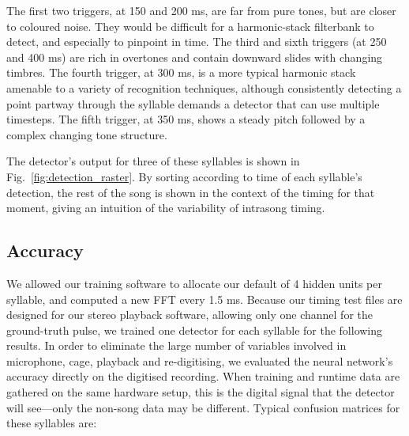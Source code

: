 \documentclass[10pt,letterpaper]{article}
\newcommand\fig[1]{Fig.~\ref{#1}}
\let\oldmarginpar\marginpar
\renewcommand{\marginpar}[1]{\oldmarginpar{\linespread{1}\scriptsize{#1}}}
\begin{document}
The first two triggers, at 150 and 200 ms, are far from pure tones, but are closer to coloured noise.  They would be difficult for a harmonic-stack filterbank to detect, and especially to pinpoint in time.  The third and sixth triggers (at 250 and 400 ms) are rich in overtones and contain downward slides with changing timbres.  The fourth trigger, at 300 ms, is a more typical harmonic stack amenable to a variety of recognition techniques, although consistently detecting a point partway through the syllable demands a detector that can use multiple timesteps.  The fifth trigger, at 350 ms, shows a steady pitch followed by a complex changing tone structure.

The detector's output for three of these syllables is shown in \fig{fig:detection_raster}.   By sorting according to time of each syllable's detection, the rest of the song is shown in the context of the timing for that moment, giving an intuition of the variability of intrasong timing.

\subsection{Accuracy}

We allowed our training software to allocate our default of 4 hidden units per syllable, and computed a new FFT every 1.5 ms.  Because our timing test files are designed for our stereo playback software, allowing only one channel for the ground-truth pulse, we trained one detector for each syllable for the following results.  In order to eliminate the large number of variables involved in microphone, cage, playback and re-digitising, we evaluated the neural network's accuracy directly on the digitised recording.  When training and runtime data are gathered on the same hardware setup, this is the digital signal that the detector will see---only the non-song data may be different.
Typical confusion matrices for these syllables are:
\end{document}
